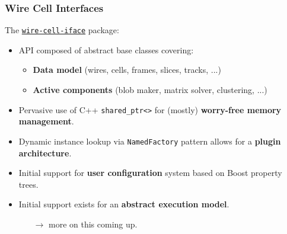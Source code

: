 \begin{frame}[fragile]
  \frametitle{Wire Cell Interfaces}

  The \href{https://github.com/WireCell/wire-cell-iface}{\texttt{wire-cell-iface}} package:

  \begin{itemize}
  \item API composed of abstract base classes covering:
    \begin{itemize}
    \item \textbf{Data model} (wires, cells, frames, slices, tracks, ...)
    \item \textbf{Active components} (blob maker, matrix solver, clustering, ...)
    \end{itemize}
  \item Pervasive use of C++ \verb|shared_ptr<>| for (mostly) \textbf{worry-free memory management}.
  \item Dynamic instance lookup via \texttt{NamedFactory} pattern
    allows for a \textbf{plugin architecture}.
  \item Initial support for \textbf{user configuration} system based on Boost
    property trees.
  \item Initial support exists for an \textbf{abstract execution model}.
    \begin{itemize}\scriptsize
    \item[$\rightarrow$] more on this coming up.
    \end{itemize}
  \end{itemize}
\end{frame}

